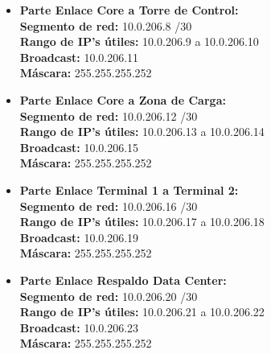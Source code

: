 \begin{itemize}[leftmargin=*]
    \item \textbf{Parte Enlace Core a Torre de Control:} \\
    \textbf{Segmento de red:} 10.0.206.8 /30 \\
    \textbf{Rango de IP's útiles:} 10.0.206.9 a 10.0.206.10 \\
    \textbf{Broadcast:} 10.0.206.11 \\
    \textbf{Máscara:} 255.255.255.252 
    \vspace{5pt}

    \item \textbf{Parte Enlace Core a Zona de Carga:} \\
    \textbf{Segmento de red:} 10.0.206.12 /30 \\
    \textbf{Rango de IP's útiles:} 10.0.206.13 a 10.0.206.14 \\
    \textbf{Broadcast:} 10.0.206.15 \\
    \textbf{Máscara:} 255.255.255.252 
    \vspace{5pt}

    \item \textbf{Parte Enlace Terminal 1 a Terminal 2:} \\
    \textbf{Segmento de red:} 10.0.206.16 /30 \\
    \textbf{Rango de IP's útiles:} 10.0.206.17 a 10.0.206.18 \\
    \textbf{Broadcast:} 10.0.206.19 \\
    \textbf{Máscara:} 255.255.255.252 
    \vspace{5pt}

    \item \textbf{Parte Enlace Respaldo Data Center:} \\
    \textbf{Segmento de red:} 10.0.206.20 /30 \\
    \textbf{Rango de IP's útiles:} 10.0.206.21 a 10.0.206.22 \\
    \textbf{Broadcast:} 10.0.206.23 \\
    \textbf{Máscara:} 255.255.255.252 
\end{itemize}